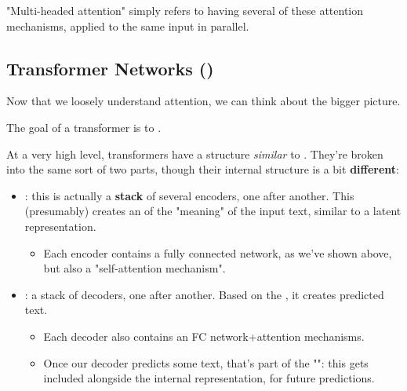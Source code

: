         "Multi-headed attention" simply refers to having several of these attention mechanisms, applied to the same input in parallel.

    \subsection{Transformer Networks ()}

        Now that we loosely understand attention, we can think about the bigger picture.

        The goal of a transformer is to .

        At a very high level, transformers have a structure \textit{similar} to . They're broken into the same sort of two parts, though their internal structure is a bit \textbf{different}:

        \begin{itemize}
            \item {}: this is actually a \textbf{stack} of several encoders, one after another. This (presumably) creates an  of the "meaning" of the input text, similar to a latent representation.
            
            \begin{itemize}
                \item Each encoder contains a fully connected network, as we've shown above, but also a "self-attention mechanism".
            \end{itemize}

            \item {}: a stack of decoders, one after another. Based on the , it creates  predicted text.
                \begin{itemize}
                    \item Each decoder also contains an FC network+attention mechanisms.
                    \item Once our decoder predicts some text, that's part of the "": this gets included alongside the internal representation, for future predictions.\\
                \end{itemize}
        \end{itemize}

